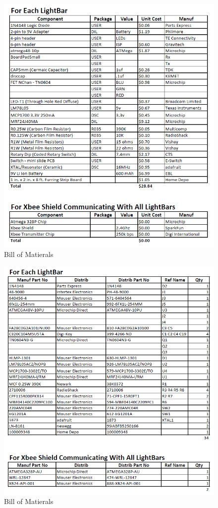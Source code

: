 \documentclass[12pt]{article}
\begin{document}
{{{{{{{	\begin{figure}[ht!]
		\centering
		\includegraphics[width=140mm]{assets/Bill_of_Materials_Pg1.png}
		\caption{Bill of Matierals}
	\end{figure}

	\begin{figure}[ht!]
		\centering
		\includegraphics[width=140mm]{assets/Bill_of_Materials_Pg2.png}
		\caption{Bill of Matierals}
	\end{figure}

}}}}}}}
\end{document}
